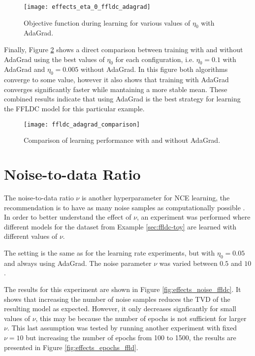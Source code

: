 \begin{figure}
  \centering
  \texttt{[image: effects\_eta\_0\_ffldc\_adagrad]}
  \caption{Objective function during learning for various values of $\eta_0$ with AdaGrad.}
  \label{fig:effects_adagrad}
\end{figure}

Finally, Figure \ref{fig:comparison_adagrad_ffldc_toy} shows a direct comparison between training with and without AdaGrad using the best values of $\eta_0$ for each configuration, i.e. $\eta_{0} = 0.1$ with AdaGrad and $\eta_{0} = 0.005$ without AdaGrad. In this figure both algorithms converge to some value, however it also shows that training with AdaGrad converges significantly faster while mantaining a more stable mean. These combined results indicate that using AdaGrad is the best strategy for learning the FFLDC model for this particular example.

\begin{figure}
  \centering
  \texttt{[image: ffldc\_adagrad\_comparison]}
  \caption{Comparison of learning performance with and without AdaGrad.}
  \label{fig:comparison_adagrad_ffldc_toy}
\end{figure}

\section{Noise-to-data Ratio}

The noise-to-data ratio $\nu$ is another hyperparameter for NCE learning, the recommendation is to have as many noise samples as computationally possible \citep{Gutmann12NCE}. In order to better understand the effect of $\nu$, an experiment was performed where different models for the dataset from Example \ref{sec:ffldc-toy} are learned with different values of $\nu$.

The setting is the same as for the learning rate experiments, but with $\eta_{0} = 0.05$ and always using AdaGrad. The noise parameter $\nu$ was varied between $0.5$ and $10$.

The results for this experiment are shown in Figure \ref{fig:effects_noise_ffldc}. It shows that increasing the number of noise samples reduces the TVD of the resulting model as expected. However, it only decreases signficantly for small values of $\nu$, this may be because the number of epochs is not sufficient for larger $\nu$. This last assumption was tested by running another experiment with fixed $\nu = 10$ but increasing the number of epochs from 100 to 1500, the results are presented in Figure \ref{fig:effects_epochs_ffld}.


